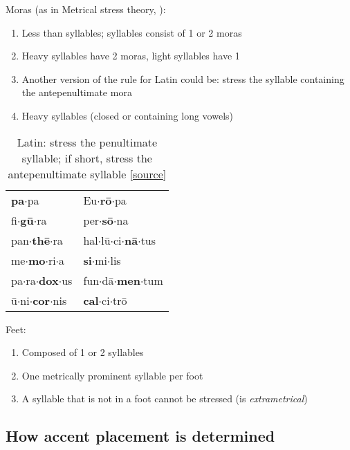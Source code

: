 \documentclass[a4paper, 12pt]{article}
\begin{document}
	Moras (as in Metrical stress theory, \cite{hayes1995}):
	
	\begin{enumerate}[$\gg$]
		\item Less than syllables; syllables consist of 1 or 2 moras
		\item Heavy syllables have 2 moras, light syllables have 1
		\item Another version of the rule for Latin could be: stress the syllable containing the antepenultimate mora
		\item Heavy syllables (closed or containing long vowels)
	\end{enumerate}
	
\begin{table}[H]
\centering
\begin{tabular}{ll}
\textbf{pa}$\cdot$pa        & Eu$\cdot$\textbf{rō}$\cdot$pa         \\
fi$\cdot$\textbf{gū}$\cdot$ra     & per$\cdot$\textbf{sō}$\cdot$na        \\
pan$\cdot$\textbf{thē}$\cdot$ra   & hal$\cdot$lū$\cdot$ci$\cdot$\textbf{nā}$\cdot$tus \\
me$\cdot$\textbf{mo}$\cdot$ri$\cdot$a   & \textbf{si}$\cdot$mi$\cdot$lis        \\
pa$\cdot$ra$\cdot$\textbf{dox}$\cdot$us & fun$\cdot$dā$\cdot$\textbf{men}$\cdot$tum   \\
ū$\cdot$ni$\cdot$\textbf{cor}$\cdot$nis & \textbf{cal}$\cdot$ci$\cdot$trō      
\end{tabular}
\caption*{Latin: stress the penultimate syllable; if short, stress the antepenultimate syllable [\href{https://en.wikiversity.org/wiki/Latin/Pronunciation\_Stress}{source}]}
\end{table}
	

	Feet:
	
	\begin{enumerate}[$\gg$]
		\item Composed of 1 or 2 syllables
		\item One metrically prominent syllable per foot
		\item A syllable that is not in a foot cannot be stressed (is \emph{extrametrical})
	\end{enumerate}
	
			\subsection{How accent placement is determined}
			
\end{document}
